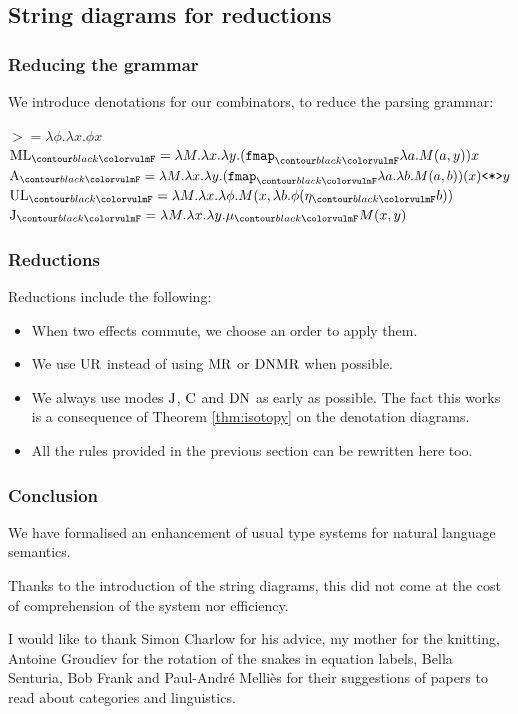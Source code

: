 \documentclass[math, english, info]{beamercours}
\begin{document}
\subsection{String diagrams for reductions}
\begin{frame}
	\frametitle{Reducing the grammar}
	We introduce denotations for our combinators, to reduce the parsing grammar:
	\pause
	\begin{center}
		$	>                    = \lambda \phi. \lambda x. \phi x $\\[1.5ex]
		$ \combML_{\f{F}}      = \lambda M. \lambda x. \lambda y. (\fmap_{\f{F}} \lambda a. M(a, y)) x $\\[1.5ex]
		$	\combA_{\f{F}}       = \lambda M. \lambda x. \lambda y. (\fmap_{\f{F}}\lambda a. \lambda b. M(a, b))(x) \texttt{<*>} y $\\[1.5ex]
		$	\combUL_{\f{F}}      = \lambda M. \lambda x. \lambda \phi. M(x, \lambda b. \phi(\eta_{\f{F}} b))$\\[1.5ex]
		$ \combJ_{\f{F}}       = \lambda M. \lambda x. \lambda y. \mu_{\f{F}} M(x, y) $\\[1.5ex]
	\end{center}
\end{frame}

\begin{frame}
	\frametitle{Reductions}
	Reductions include the following:
	\begin{itemize}
		\item When two effects commute, we choose an order to apply them.
		\item We use $\text{UR}$ instead of using $\text{MR}$ or $\text{DN} \text{MR}$ when
		      possible.
		\item We always use modes $\text{J}$, $\text{C}$ and $\text{DN}$ as early as
		      possible.
		      The fact this works is a consequence of Theorem \ref{thm:isotopy} on
		      the denotation diagrams.
		\item All the rules provided in the previous section can be rewritten here
		      too.
	\end{itemize}
\end{frame}

\begin{frame}
	\frametitle{Conclusion}
	We have formalised an enhancement of usual type systems for natural language
	semantics.

	\medskip

	Thanks to the introduction of the string diagrams, this did not come at the
	cost of comprehension of the system nor efficiency.

	\pause\medskip

	I would like to thank Simon Charlow for his advice, my mother for the
	knitting, Antoine Groudiev for the rotation of the snakes in equation labels,
	Bella Senturia, Bob Frank and Paul-André Melliès for their suggestions of
	papers to read about categories and linguistics.
\end{frame}
\end{document}
